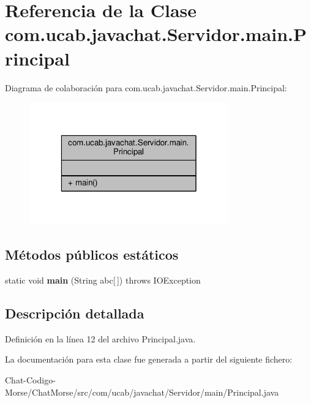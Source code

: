 \hypertarget{classcom_1_1ucab_1_1javachat_1_1_servidor_1_1main_1_1_principal}{\section{Referencia de la Clase com.\-ucab.\-javachat.\-Servidor.\-main.\-Principal}
\label{classcom_1_1ucab_1_1javachat_1_1_servidor_1_1main_1_1_principal}
}


Diagrama de colaboración para com.\-ucab.\-javachat.\-Servidor.\-main.\-Principal\-:
\nopagebreak
\begin{figure}[H]
\begin{center}
\leavevmode
\includegraphics[width=244pt]{de/d41/classcom_1_1ucab_1_1javachat_1_1_servidor_1_1main_1_1_principal__coll__graph}
\end{center}
\end{figure}
\subsection*{Métodos públicos estáticos}
\begin{DoxyCompactItemize}
\item 
\hypertarget{classcom_1_1ucab_1_1javachat_1_1_servidor_1_1main_1_1_principal_aab5df0d2fa877ce007a67fa8be56df79}{static void {\bfseries main} (String abc\mbox{[}$\,$\mbox{]})  throws I\-O\-Exception 	   }\label{classcom_1_1ucab_1_1javachat_1_1_servidor_1_1main_1_1_principal_aab5df0d2fa877ce007a67fa8be56df79}

\end{DoxyCompactItemize}


\subsection{Descripción detallada}


Definición en la línea 12 del archivo Principal.\-java.



La documentación para esta clase fue generada a partir del siguiente fichero\-:\begin{DoxyCompactItemize}
\item 
Chat-\/\-Codigo-\/\-Morse/\-Chat\-Morse/src/com/ucab/javachat/\-Servidor/main/Principal.\-java\end{DoxyCompactItemize}
